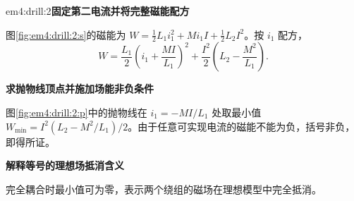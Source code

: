 \begin{drillsolution}{em4:drill:2}\textbf{固定第二电流并将完整磁能配方}\par\nobreak
图\ref{fig:em4:drill:2:s}的磁能为 $W=\tfrac12L_1i_1^2+Mi_1I+\tfrac12L_2I^2$。按 $i_1$ 配方，
\[W=\frac{L_1}{2}\left(i_1+\frac{MI}{L_1}\right)^2+\frac{I^2}{2}\left(L_2-\frac{M^2}{L_1}\right).\]



\par\medskip{}\noindent\textbf{求抛物线顶点并施加场能非负条件}\par\nobreak
图\ref{fig:em4:drill:2:p}中的抛物线在 $i_1=-MI/L_1$ 处取最小值 $W_{\min}=I^2(L_2-M^2/L_1)/2$。由于任意可实现电流的磁能不能为负，括号非负，即得所证。

\par\medskip{}\noindent\textbf{解释等号的理想场抵消含义}\par\nobreak
完全耦合时最小值可为零，表示两个绕组的磁场在理想模型中完全抵消。\end{drillsolution}

